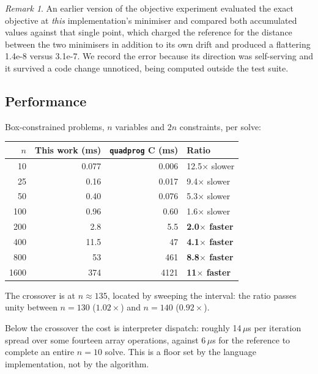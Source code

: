 \documentclass[11pt,a4paper]{article}
\theoremstyle{plain}
\theoremstyle{remark}
\newtheorem*{remark}{Remark}
\begin{document}
\begin{remark}
An earlier version of the objective experiment evaluated the exact objective at
\emph{this} implementation's minimiser and compared both accumulated values
against that single point, which charged the reference for the distance between
the two minimisers in addition to its own drift and produced a flattering
1.4e-8 versus 3.1e-7. We record the error because its direction was
self-serving and it survived a code change unnoticed, being computed outside the
test suite.
\end{remark}

\subsection{Performance}
\label{sec:perf}

Box-constrained problems, $n$ variables and $2n$ constraints, per solve:

\begin{center}
\begin{tabular}{r r r l}
  \toprule
  $n$ & This work (ms) & {\texttt{quadprog} C (ms)} & Ratio \\
  \midrule
  10   & 0.077 & 0.006 & 12.5$\times$ slower \\
  25   & 0.16  & 0.017 & 9.4$\times$ slower \\
  50   & 0.40  & 0.076 & 5.3$\times$ slower \\
  100  & 0.96  & 0.60  & 1.6$\times$ slower \\
  200  & 2.8   & 5.5   & \textbf{2.0$\times$ faster} \\
  400  & 11.5  & 47    & \textbf{4.1$\times$ faster} \\
  800  & 53    & 461   & \textbf{8.8$\times$ faster} \\
  1600 & 374   & 4121  & \textbf{11$\times$ faster} \\
  \bottomrule
\end{tabular}
\end{center}

The crossover is at $n \approx 135$, located by sweeping the interval: the ratio
passes unity between $n = 130$ ($1.02\times$) and $n = 140$ ($0.92\times$).

Below the crossover the cost is interpreter dispatch: roughly 14\,$\mu$s
per iteration spread over some fourteen array operations, against
6\,$\mu$s for the reference to complete an entire $n = 10$ solve.
This is a floor set by the language implementation, not by the algorithm.
\end{document}
